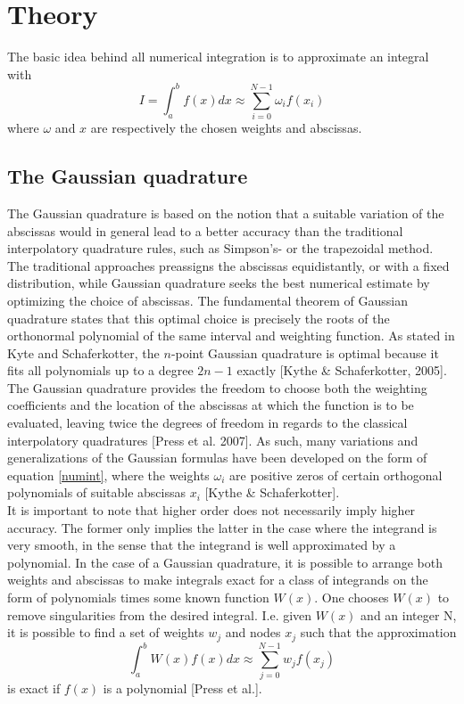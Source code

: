 \documentclass[%
reprint,nofootinbib,
amsmath,amssymb,
aps,
]{revtex4-1}
\begin{document}
\section{Theory} \noindent 
The basic idea behind all numerical integration is to approximate an integral with
\begin{equation}\label{numint}
I = \int_{a}^{b}f(x)dx \approx \sum_{i=0}^{N-1} \omega_if(x_i)
\end{equation}
where $\omega$ and $x$ are respectively the chosen weights and abscissas. 


\subsection*{The Gaussian quadrature} \noindent 
The Gaussian quadrature is based on the notion that a suitable variation of the abscissas would in general lead to a better accuracy than the traditional interpolatory quadrature rules, such as Simpson's- or the trapezoidal method. The traditional approaches preassigns the abscissas equidistantly, or with a fixed distribution, while Gaussian quadrature seeks the best numerical estimate by optimizing the choice of abscissas. The fundamental theorem of Gaussian quadrature states that this optimal choice is precisely the roots of the orthonormal polynomial of the same interval and weighting function. As stated in Kyte and Schaferkotter, the $n$-point Gaussian quadrature is optimal because it fits all polynomials up to a degree $2n-1$ exactly [Kythe \& Schaferkotter, 2005]. \\ \indent 
The Gaussian quadrature provides the freedom to choose both the weighting coefficients and the location of the abscissas at which the function is to be evaluated, leaving twice the degrees of freedom in regards to the classical interpolatory quadratures [Press et al. 2007]. As such, many variations and generalizations of the Gaussian formulas have been developed on the form of equation \ref{numint}, where the weights $\omega_i$ are positive zeros of certain orthogonal polynomials of suitable abscissas $x_i$ [Kythe \& Schaferkotter]. \\
\indent It is important to note that higher order does not necessarily imply higher accuracy. The former only implies the latter in the case where the integrand is very smooth, in the sense that the integrand is well approximated by a polynomial. In the case of a Gaussian quadrature, it is possible to arrange both weights and abscissas to make integrals exact for a class of integrands on the form of polynomials times some known function $W(x)$. One chooses $W(x)$ to remove singularities from the desired integral. I.e. given $W(x)$ and an integer N, it is possible to find a set of weights $w_j$ and nodes $x_j$ such that the approximation 
\begin{equation*}
	\int_{a}^{b}W(x)f(x)dx \approx \sum_{j = 0}^{N-1}w_jf(x_j)
\end{equation*}
is exact if $f(x)$ is a polynomial [Press et al.].
\end{document}
